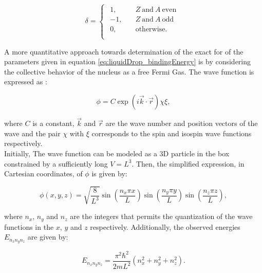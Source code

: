 \documentclass[openany]{book}
\begin{document}
\begin{equation} \label{eq:liquidDrop_deltaFactor}
	\delta = 	\left\{\begin{array}{l}
		\begin{split}
			1, \quad & Z \ \mathrm{and} \ A \  \mathrm{even} \\ 
			-1, \quad &  Z \ \mathrm{and} \ A \  \mathrm{odd} 	\\
			0, \quad & \mathrm{otherwise}.	\\
		\end{split}
	\end{array}\right.
\end{equation}

A more quantitative approach towards determination of the exact for of the parameters given in equation \ref{eq:liquidDrop_bindingEnergy} is by considering the collective behavior of the nucleus as a free Fermi Gas. The wave function is expressed as \cite{bohr_mottelson_1998}: 

\begin{equation}\label{eq:liquidDrop_FermiGas}
	\phi = C \exp (i \vec k \cdot \vec r) \chi \xi, 
\end{equation}

where $C$ is a constant, $\vec k$ and $\vec r$ are the wave number and position vectors of the wave and the pair $\chi$ with $ \xi$ corresponds to the spin and isospin wave functions respectively. \\

Initially, The wave function can be modeled as a 3D particle in the box constrained by a sufficiently long $V = L^3$. Then, the simplified expression, in Cartesian coordinates, of $\phi$ is given by:

\begin{equation}\label{eq:liquidDrop_FermiGas_wavefunction}
	\phi(x, y, z) = \sqrt{\frac{8}{L^3}} \sin \left( \frac{n_x \pi x }{L}\right)  \sin \left( \frac{n_y \pi y }{L}\right)  \sin \left( \frac{n_z \pi z }{L}\right),
\end{equation}

where $n_x$, $n_y$ and $n_z$ are the integers that permits the quantization of the wave functions in the $x$, $y$ and $z$ respectively. Additionally, the observed energies $E_{n_xn_yn_z}$ are given by: 

\begin{equation}\label{eq:liquidDrop_FermiGas_energies}
	E_{n_xn_yn_z} = \frac{\pi^2 \hbar^2 }{2mL^2} (n^2_x + n^2_y + n^2_z).
\end{equation}
\end{document}

